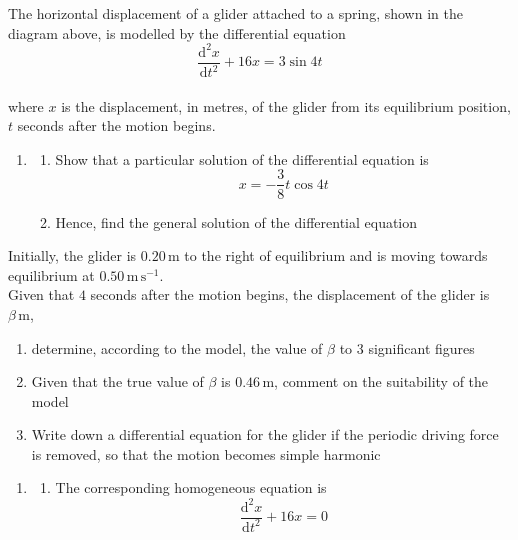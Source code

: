 \documentclass[leqno]{article}
\begin{document}
\begin{enumerate}[
  label=\textbf{\arabic*.},
  leftmargin=*,
  topsep=0pt,
  partopsep=0pt,
  parsep=0pt
]
The horizontal displacement of a glider attached to a spring, shown in the diagram above, is modelled by the differential equation \\
\[\frac{\mathrm{d}^2 x}{\mathrm{d} t^2}+16x=3\sin 4t\] \\
where $x$ is the displacement, in metres, of the glider from its equilibrium position, $t$ seconds after the motion begins. \\
\begin{enumerate}[label=\textbf{(\alph*)}]
  \item
  \begin{enumerate}[label=(\roman*)]
    \item Show that a particular solution of the differential equation is
    \[
    x=-\frac{3}{8} t \cos 4t
    \] 
    \item Hence, find the general solution of the differential equation  \\
  \end{enumerate}
\end{enumerate}
Initially, the glider is $0.20\,\mathrm{m}$ to the right of equilibrium and is moving towards equilibrium at $0.50\,\mathrm{m\,s^{-1}}$. \\
Given that $4$ seconds after the motion begins, the displacement of the glider is $\beta\,\mathrm{m}$, \\
\begin{enumerate}[label=\textbf{(\alph*)}, resume]
  \item determine, according to the model, the value of $\beta$ to $3$ significant figures  \\
  \item Given that the true value of $\beta$ is $0.46\,\mathrm{m}$, comment on the suitability of the model  \\
  \item Write down a differential equation for the glider if the periodic driving force is removed, so that the motion becomes simple harmonic  \\
\end{enumerate}

\vspace*{10pt}

\begin{djsSolution}
\begin{enumerate}[label=\textbf{(\alph*)}]
  \item
  \begin{enumerate}[label=(\roman*)]
    \item The corresponding homogeneous equation is
    \[
    \frac{\mathrm{d}^2x}{\mathrm{d}t^2}+16x=0
    \]


\end{enumerate}
\end{enumerate}
\end{djsSolution}
\end{enumerate}
\end{document}
